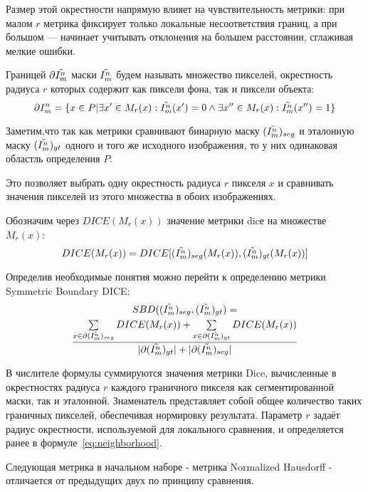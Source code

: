 Размер этой окрестности напрямую влияет на чувствительность метрики: при малом  \(r\) метрика фиксирует только локальные несоответствия границ, а при большом — начинает учитывать отклонения на большем расстоянии, сглаживая мелкие ошибки.

Границей \(\partial \tilde{I^n_m} \) маски \(\tilde{I^n_m} \) будем называть множество пикселей, окрестность радиуса \(r\) которых содержит как пиксели фона, так и пиксели объекта:
\begin{equation}\label{eq:boundary}
    \partial I^n_m = \{ x \in P | \exists x' \in M_r(x) : \tilde{I^n_m}(x') = 0 \land  \exists x'' \in M_r(x) : \tilde{I^n_m}(x'') = 1 \}
\end{equation}

Заметим,что так как метрики сравнивают бинарную маску \((\tilde{I^n_m})_{seg}\) и эталонную маску \((\tilde{I^n_m})_{gt}\) одного и того же исходного изображения, то у них одинаковая областль определения \(P\). 

Это позволяет выбрать одну окрестность радиуса \(r\) пикселя \(x\) и сравнивать значения пикселей из этого множества в обоих изображениях.

Обозначим через \(DICE(M_r(x))\) значение метрики dicе на множестве \(M_r(x)\): 
\begin{equation}
    DICE(M_r(x)) = DICE[(\tilde{I^n_m})_{seg}(M_r(x)), (\tilde{I^n_m})_{gt}(M_r(x))]
\end{equation}

Определив необходимые понятия можно перейти к определению метрики Symmetric Boundary DICE:
\begin{multline}\label{eq:SBD}
    SBD((\tilde{I^n_m})_{seg}, (\tilde{I^n_m})_{gt}) = \\
    \frac{
        \sum\limits_{x \in \partial (\tilde{I^n_m})_{seg}} DICE(M_r(x)) 
        + \sum\limits_{x \in \partial (\tilde{I^n_m})_{gt}} DICE(M_r(x))
    }{
        |\partial (\tilde{I^n_m})_{gt}| + |\partial (\tilde{I^n_m})_{seg}|
    }
\end{multline}

В числителе формулы суммируются значения метрики Dice, вычисленные в окрестностях радиуса \(r\)  каждого граничного пикселя как сегментированной маски, так и эталонной. Знаменатель представляет собой общее количество таких граничных пикселей, обеспечивая нормировку результата. Параметр \(r\) задаёт радиус окрестности, используемой для локального сравнения, и определяется ранее в формуле~\eqref{eq:neighborhood}.

Следующая метрика в начальном наборе - метрика Normalized Hausdorff - отличается от предыдущих двух по принципу сравнения.

